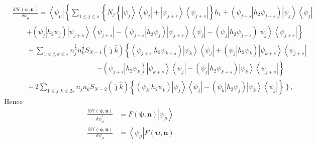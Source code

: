 \documentclass[aps,preprint]{revtex4}%
\begin{document}
\begin{align}
&  \frac{\delta\mathcal{H}\left(  \mathbf{\psi,n}\right)  }{\delta\psi_{\mu}%
}=\left\langle \psi_{\mu}\right\vert \left\{  \sum_{1\leq j\leq s}\left\{
N_{j}\left\{  \left\vert \psi_{j}\right\rangle \left\langle \psi
_{j}\right\vert +\left\vert \psi_{j+s}\right\rangle \left\langle \psi
_{j+s}\right\vert \right\}  h_{1}+\left(  \left.  \psi_{j+s}\right\vert
h_{2}\psi_{j+s}\right)  \left\vert \psi_{j}\right\rangle \left\langle \psi
_{j}\right\vert \right.  \right.  \nonumber\\
&  \qquad\left.  +\left(  \left.  \psi_{j}\right\vert h_{2}\psi_{j}\right)
\left\vert \psi_{j+s}\right\rangle \left\langle \psi_{j+s}\right\vert -\left(
\left.  \psi_{j+s}\right\vert h_{2}\psi_{j}\right)  \left\vert \psi
_{j+s}\right\rangle \left\langle \psi_{j}\right\vert -\left(  \left.  \psi
_{j}\right\vert h_{2}\psi_{j+s}\right)  \left\vert \psi_{j}\right\rangle
\left\langle \psi_{j+s}\right\vert \right\}  \nonumber\\
&  \qquad+\sum_{1\leq j,k\leq s}n_{j}^{\frac{1}{2}}n_{k}^{\frac{1}{2}}%
S_{N-1}\left(  \hat{\jmath}\hat{k}\right)  \left\{  \left(  \left.  \psi
_{j+s}\right\vert h_{2}\psi_{k+s}\right)  \left\vert \psi_{k}\right\rangle
\left\langle \psi_{j}\right\vert +\left(  \left.  \psi_{j}\right\vert
h_{2}\psi_{k}\right)  \left\vert \psi_{k+s}\right\rangle \left\langle
\psi_{j+s}\right\vert \right.  \nonumber\\
&  \qquad\qquad\qquad\qquad\qquad\qquad\left.  -\left(  \left.  \psi
_{j+s}\right\vert h_{2}\psi_{k}\right)  \left\vert \psi_{k+s}\right\rangle
\left\langle \psi_{j}\right\vert -\left(  \left.  \psi_{j}\right\vert
h_{2}\psi_{k+s}\right)  \left\vert \psi_{k}\right\rangle \left\langle
\psi_{j+s}\right\vert \right\}  \nonumber\\
&  \qquad+2\sum_{1\leq j,k\leq2s}n_{j}n_{k}S_{N-2}\left(  \hat{\jmath}\hat
{k}\right)  \left\{  \left(  \left.  \psi_{k}\right\vert h_{2}\psi_{k}\right)
\left\vert \psi_{j}\right\rangle \left\langle \psi_{j}\right\vert -\left(
\left.  \psi_{k}\right\vert h_{2}\psi_{j}\right)  \left\vert \psi
_{k}\right\rangle \left\langle \psi_{j}\right\vert \right\}  \left.
\overset{}{}\right\}  ,
\end{align}
Hence%
\begin{align}
\frac{\delta\mathcal{H}\left(  \mathbf{\psi,n}\right)  }{\delta\psi_{\mu
}^{\ast}} &  =F\left(  \mathbf{\psi,n}\right)  \left\vert \psi_{\mu
}\right\rangle \\
\frac{\delta\mathcal{H}\left(  \mathbf{\psi,n}\right)  }{\delta\psi_{\mu}} &
=\left\langle \psi_{\mu}\right\vert F\left(  \mathbf{\psi,n}\right)
\end{align}
\end{document}
